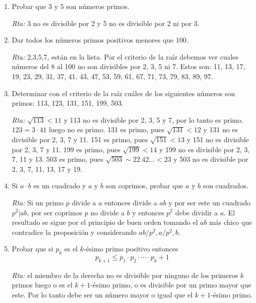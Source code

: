 \documentclass[a4paper,12pt,twoside,spanish,reqno]{amsbook}
\numberwithin{equation}{section}
\newcommand{\rta}{\noindent\textit{Rta: }}
\begin{document}
\begin{enumerate}
\begin{enumerate}
     \rta  usar el inciso anterior con $d=(a,b)$.
\end{enumerate}



\item Probar que 3  y 5 son números primos.

 \rta  3 no es divisible por 2 y 5 no es divisible por 2 ni por 3.


\item  Dar todos los números primos positivos menores que 100.

\rta  2,3,5,7, están en la lista. Por  el criterio de la raíz debemos ver cuales números del  8 al 100 no son divisibles  por 2, 3, 5 ni 7. Estos son: 11, 13, 17, 19, 23, 29, 31, 37, 41, 43, 47, 53, 59, 61, 67, 71, 73, 79, 83, 89, 97.
 


\item Determinar con el criterio de la raíz cuáles de los siguientes números son primos: 113, 123, 131, 151, 199, 503.

 \rta  $\sqrt{113}< 11$ y 113 no es divisible por 2, 3, 5 y 7, por lo tanto es primo. $123=3\cdot 41$ luego no es primo. 131 es primo, pues $\sqrt{131}<12$ y 131 no es divisible por 2, 3, 7 y 11. 151 es primo, pues $\sqrt{151}<13$ y 151 no es divisible por 2, 3, 7 y 11. 199 es primo, pues $\sqrt{199}<14$ y 199 no es divisible por 2, 3, 7, 11 y 13. 503 es primo, pues $\sqrt{503} \sim 22.42...<23$ y 503 no es divisible por 2, 3, 7, 11, 13, 17 y 19.
 


\item Si $a\cdot b$ es un cuadrado y $a$ y $b$ son coprimos, probar que $a$ y $b$ son cuadrados.

\rta  Si un primo $p$ divide a $a$ entonces divide a $ab$ y por ser este un cuadrado $p^2\vert ab$, por ser coprimos $p$ no divide a $b$ y entonces $p^2$ debe dividir a $a$. El resultado se sigue por el principio de buen orden tomando el $ab$ más chico que contradice la proposición y considerando $ab/p^2, a/p^2, b$.



\item Probar que si $p_k$ es el $k$-\'esimo primo positivo entonces $$p_{k+1}\leq p_1\cdot p_2\cdot \cdots \cdot p_k+1$$

 \rta  el miembro de la derecha no es divisible por ninguno de los primeros $k$ primos luego o es el $k+1$-ésimo primo, o es divisible por un primo mayor que este. Por lo tanto debe ser un número mayor o igual que el $k+1$-ésimo primo.
 

\end{enumerate}
\end{document}
